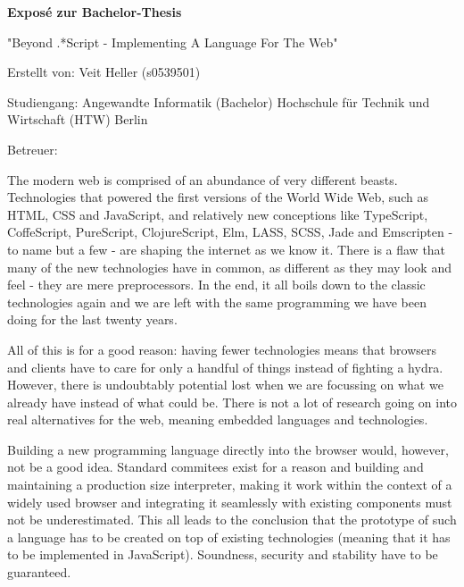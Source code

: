 \documentclass[oneside,11pt,xetex]{scrbook}
\begin{document}
\renewcommand{\thepage}{\roman{page}}

\pagestyle{empty}

\frontmatter

\vspace*{0.4\textheight}

\begin{flushleft}
\Large{\textbf{Exposé zur Bachelor-Thesis}}
\vspace{0.5cm}

\large{"Beyond .*Script - Implementing A Language For The Web"}
\vspace{0.5cm}

Erstellt von: Veit Heller (s0539501)
\vspace{0.1cm}

Studiengang:  Angewandte Informatik (Bachelor)\linebreak
Hochschule für Technik und Wirtschaft (HTW) Berlin
\vspace{0.1cm}

Betreuer:
\end{flushleft}

\date{\today}


The modern web is comprised of an abundance of very different beasts. Technologies that powered the first versions of the World Wide Web, such as HTML, CSS and JavaScript, and relatively new conceptions like TypeScript, CoffeScript, PureScript, ClojureScript, Elm, LASS, SCSS, Jade and Emscripten - to name but a few - are shaping the internet as we know it. There is a flaw that many of the new technologies have in common, as different as they may look and feel - they are mere preprocessors. In the end, it all boils down to the classic technologies again and we are left with the same programming we have been doing for the last twenty years.
\vspace{0.3cm}

All of this is for a good reason: having fewer technologies means that browsers and clients have to care for only a handful of things instead of fighting a hydra. However, there is undoubtably potential lost when we are focussing on what we already have instead of what could be. There is not a lot of research going on into real alternatives for the web, meaning embedded languages and technologies.
\vspace{0.3cm}

Building a new programming language directly into the browser would, however, not be a good idea. Standard commitees exist for a reason and building and maintaining a production size interpreter, making it work within the context of a widely used browser and integrating it seamlessly with existing components must not be underestimated. This all leads to the conclusion that the prototype of such a language has to be created on top of existing technologies (meaning that it has to be implemented in JavaScript). Soundness, security and stability have to be guaranteed.
\end{document}
